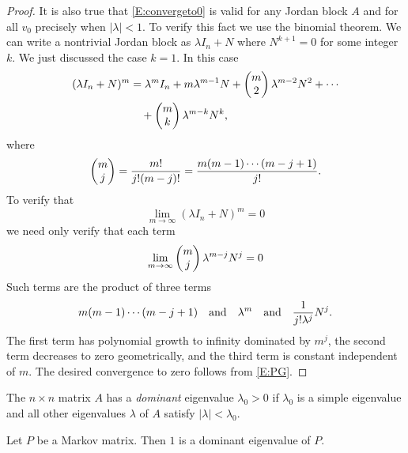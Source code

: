 \documentclass{ximera}
\begin{document}
\begin{proof}
It is also true that \eqref{E:convergeto0} is valid for any Jordan block 
$A$ and for all $v_0$ precisely when $|\lambda|<1$.  To verify this fact 
we use the binomial theorem.  
We can write a nontrivial Jordan block as
$\lambda I_n+N$ where $N^{k+1}=0$ for some integer $k$.  We just discussed 
the case $k=1$.  In this case
\begin{align*}
(\lambda I_n+N)^m &= \lambda^mI_n+m\lambda^{m-1}N + 
\left(\begin{array}{@{}c@{}} m\\2\end{array}\right)\lambda^{m-2}N^2
  +\cdots \\
  &\quad + 
\left(\begin{array}{@{}c@{}} m\\k \end{array}\right)\lambda^{m-k}N^k,
\end{align*}
where
\[
\left(\begin{array}{@{}c@{}} m \\ j\end{array}\right)
 = \frac{m!}{j!(m-j)!}=\frac{m(m-1)\cdots(m-j+1)}{j!}.
\]
To verify that 
\[
\lim_{m\to\infty}(\lambda I_n+N)^m = 0
\]
we need only verify that each term
\[
\lim_{m\to\infty}\left(\begin{array}{@{}c@{}} m\\j \end{array}\right)
\lambda^{m-j}N^j = 0
\]
Such terms are the product of three terms 
\[
m(m-1)\cdots(m-j+1) \quad\mbox{and}\quad \lambda^m \quad\mbox{and}\quad \frac{1}{j!\lambda^j}N^j.
\]
The first term has polynomial growth to infinity dominated by $m^j$, the 
second term decreases to zero geometrically, and the third term is 
constant independent of $m$. The desired convergence to zero follows from 
\eqref{E:PG}.  \end{proof}

\begin{definition}  The $n\times n$ matrix $A$ has a {\em dominant\/} eigenvalue 
$\lambda_0>0$ if $\lambda_0$ is a simple eigenvalue and all other eigenvalues
$\lambda$ of $A$ satisfy $|\lambda|<\lambda_0$.
\end{definition}


\begin{theorem}  \label{T:Markovdom}
Let $P$ be a Markov matrix. Then $1$ is a dominant eigenvalue of $P$.
\end{theorem}
\end{document}
